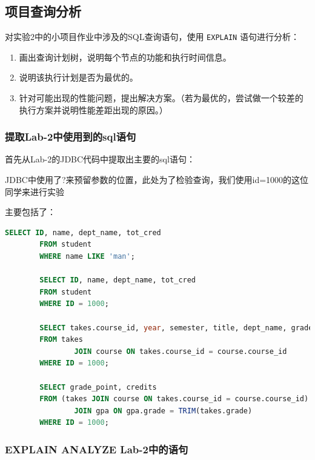 \documentclass{article}
\begin{document}
	\subsection{项目查询分析}
	
	对实验2中的小项目作业中涉及的SQL查询语句，使用 \texttt{EXPLAIN} 语句进行分析：
	
	\begin{enumerate}
		\item 画出查询计划树，说明每个节点的功能和执行时间信息。
		\item 说明该执行计划是否为最优的。
		\item 针对可能出现的性能问题，提出解决方案。（若为最优的，尝试做一个较差的执行方案并说明性能差距出现的原因。）
	\end{enumerate}
	
	\subsubsection{提取Lab-2中使用到的sql语句}
	
	首先从Lab-2的JDBC代码中提取出主要的sql语句：
	
	\begin{tcolorbox}[title = {备注}, colback = blue!25!white, colframe = blue!75!black]
		JDBC中使用了?来预留参数的位置，此处为了检验查询，我们使用id=1000的这位同学来进行实验
	\end{tcolorbox}
	
	主要包括了：
	
	\begin{lstlisting}[language=sql, title=Lab-2中的sql语句, tabsize=4]
		SELECT ID, name, dept_name, tot_cred
		FROM student
		WHERE name LIKE 'man';
		
		SELECT ID, name, dept_name, tot_cred
		FROM student
		WHERE ID = 1000;
		
		SELECT takes.course_id, year, semester, title, dept_name, grade, credits
		FROM takes
				JOIN course ON takes.course_id = course.course_id
		WHERE ID = 1000;
		
		SELECT grade_point, credits
		FROM (takes JOIN course ON takes.course_id = course.course_id)
				JOIN gpa ON gpa.grade = TRIM(takes.grade)
		WHERE ID = 1000;
	\end{lstlisting}
	
	\subsubsection{EXPLAIN ANALYZE Lab-2中的语句}
	
\end{document}
